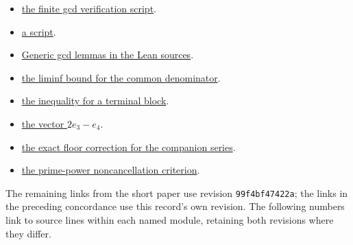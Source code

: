 \documentclass[11pt]{article}
\begin{document}
\begin{itemize}[leftmargin=*]
\item \href{https://github.com/wcook04/plectis-erdos/blob/f36a98bf3d3e6f65f1074e3b800e3293d5b8a51a/ErdosProblems/Erdos68/scripts/check_finite_source.py}{the finite gcd verification script}.
\item \href{https://github.com/wcook04/plectis-erdos/blob/f36a98bf3d3e6f65f1074e3b800e3293d5b8a51a/ErdosProblems/Erdos68/scripts/check_moment_saturation.py}{a script}.
\item \href{https://github.com/wcook04/plectis-erdos/blob/f36a98bf3d3e6f65f1074e3b800e3293d5b8a51a/ErdosProblems/Erdos68/TailIdealCertificate.lean}{Generic gcd lemmas in the Lean sources}.
\item \href{https://github.com/wcook04/plectis-erdos/blob/0b500c7cf8e8bb7ae343484378df02f277fb8194/lean/ErdosProblems/Erdos68/PaperCompleteLiminf.lean#L42}{the liminf bound for the common denominator}.
\item \href{https://github.com/wcook04/plectis-erdos/blob/d788dd4b8c59f2246000f2ed98fffb8a5e8ac72e/lean/ErdosProblems/Erdos68/ChannelIntegralCongruence.lean#L524-L529}{the inequality for a terminal block}.
\item \href{https://github.com/wcook04/plectis-erdos/blob/99f4bf47422abbd8757cbb22b50ba079d764d3a7/ErdosProblems/Erdos68/FactorialChannelCertificate.lean#L101}{the vector $2e_3-e_4$}.
\item \href{https://github.com/wcook04/plectis-erdos/blob/f36a98bf3d3e6f65f1074e3b800e3293d5b8a51a/ErdosProblems/Erdos68/CompanionConstantCarryLaw.lean}{the exact floor correction for the companion series}.
\item \href{https://github.com/wcook04/plectis-erdos/blob/f36a98bf3d3e6f65f1074e3b800e3293d5b8a51a/ErdosProblems/Erdos68/PrimePoleCriterion.lean}{the prime-power noncancellation criterion}.
\end{itemize}
\endgroup

The remaining links from the short paper use revision
\texttt{99f4bf47422a}; the links in the preceding concordance use this
record's own revision. The following numbers link to source lines within
each named module, retaining both revisions where they differ.
\end{document}
